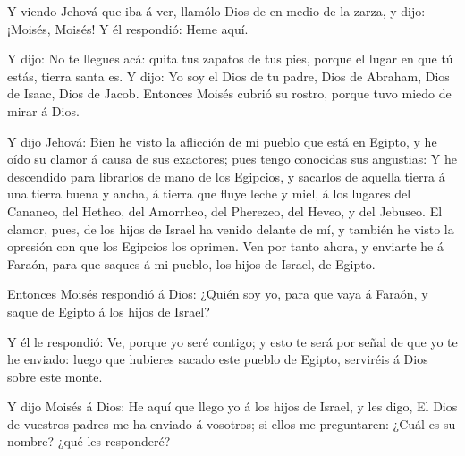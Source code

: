  Y viendo Jehová que iba á ver, llamólo Dios de en medio de
la zarza, y dijo: ¡Moisés, Moisés! Y él respondió: Heme aquí.

 Y dijo: No te llegues acá: quita tus zapatos de tus pies,
porque el lugar en que tú estás, tierra santa es.  Y dijo:
Yo soy el Dios de tu padre, Dios de Abraham, Dios de Isaac, Dios de
Jacob. Entonces Moisés cubrió su rostro, porque tuvo miedo de mirar á
Dios.

 Y dijo Jehová: Bien he visto la aflicción de mi pueblo que
está en Egipto, y he oído su clamor á causa de sus exactores; pues tengo
conocidas sus angustias:  Y he descendido para librarlos de
mano de los Egipcios, y sacarlos de aquella tierra á una tierra buena y
ancha, á tierra que fluye leche y miel, á los lugares del Cananeo, del
Hetheo, del Amorrheo, del Pherezeo, del Heveo, y del Jebuseo.
 El clamor, pues, de los hijos de Israel ha venido delante
de mí, y también he visto la opresión con que los Egipcios los oprimen.
 Ven por tanto ahora, y enviarte he á Faraón, para que
saques á mi pueblo, los hijos de Israel, de Egipto.

 Entonces Moisés respondió á Dios: ¿Quién soy yo, para que
vaya á Faraón, y saque de Egipto á los hijos de Israel?

 Y él le respondió: Ve, porque yo seré contigo; y esto te
será por señal de que yo te he enviado: luego que hubieres sacado este
pueblo de Egipto, serviréis á Dios sobre este monte.

 Y dijo Moisés á Dios: He aquí que llego yo á los hijos de
Israel, y les digo, El Dios de vuestros padres me ha enviado á vosotros;
si ellos me preguntaren: ¿Cuál es su nombre? ¿qué les responderé?

